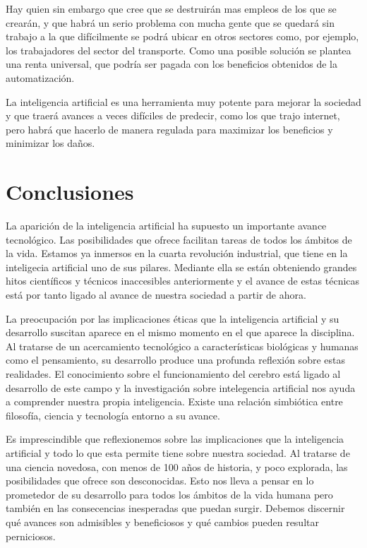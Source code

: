 \documentclass[12pt,a4paper]{article}
\begin{document}
Hay quien sin embargo que cree que se destruirán mas empleos de los que se crearán, y que habrá un serio problema con mucha gente que se quedará sin trabajo a la que difícilmente se podrá ubicar en otros sectores como, por ejemplo, los trabajadores del sector del transporte. Como una posible solución se plantea una renta universal, que podría ser pagada con los beneficios obtenidos de la automatización.

La inteligencia artificial es una herramienta muy potente para mejorar la sociedad y que traerá avances a veces difíciles de predecir, como los que trajo internet, pero habrá que hacerlo de manera regulada para maximizar los beneficios y minimizar los daños.

\section{Conclusiones}

La aparición de la inteligencia artificial ha supuesto un importante avance tecnológico. Las posibilidades que ofrece facilitan tareas de todos los ámbitos de la vida. Estamos ya inmersos en la cuarta revolución industrial, que tiene en la inteligecia artificial uno de sus pilares. Mediante ella se están obteniendo grandes hitos científicos y técnicos inaccesibles anteriormente y el avance de estas técnicas está por tanto ligado al avance de nuestra sociedad a partir de ahora.

La preocupación por las implicaciones éticas que la inteligencia artificial y su desarrollo suscitan aparece en el mismo momento en el que aparece la disciplina. Al tratarse de un acercamiento tecnológico a características biológicas y humanas como el pensamiento, su desarrollo produce una profunda reflexión sobre estas realidades. El conocimiento sobre el funcionamiento del cerebro está ligado al desarrollo de este campo y la investigación sobre intelegencia artificial nos ayuda a comprender nuestra propia inteligencia. Existe una relación simbiótica entre filosofía, ciencia y tecnología entorno a su avance.

Es imprescindible que reflexionemos sobre las implicaciones que la inteligencia artificial y todo lo que esta permite tiene sobre nuestra sociedad. Al tratarse de una ciencia novedosa, con menos de 100 años de historia, y poco explorada, las posibilidades que ofrece son desconocidas. Esto nos lleva a pensar en lo prometedor de su desarrollo para todos los ámbitos de la vida humana pero también en las consecencias inesperadas que puedan surgir. Debemos discernir qué avances son admisibles y beneficiosos y qué cambios pueden resultar perniciosos.
\end{document}
